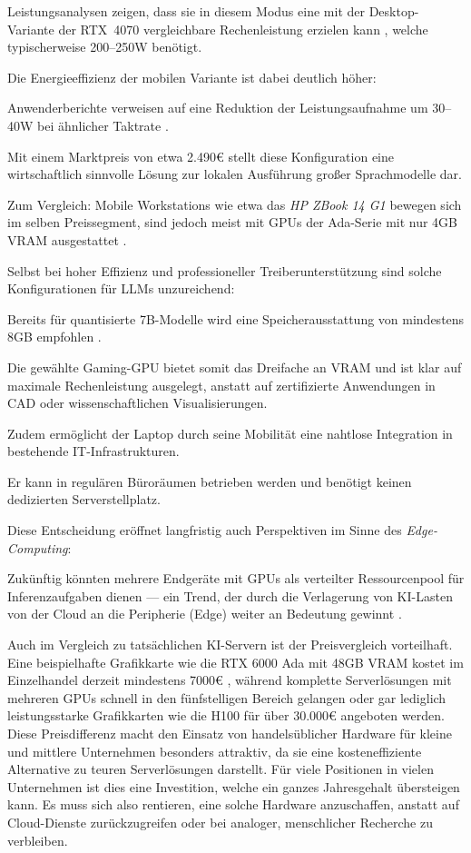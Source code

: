 Leistungsanalysen zeigen, dass sie in diesem Modus eine mit der Desktop-Variante der RTX~4070 vergleichbare Rechenleistung erzielen kann \cite{reddit_rtx_comparison}, welche typischerweise 200–250W benötigt.

Die Energieeffizienz der mobilen Variante ist dabei deutlich höher:

Anwenderberichte verweisen auf eine Reduktion der Leistungsaufnahme um 30–40W bei ähnlicher Taktrate \cite{reddit_rtx_comparison}.

Mit einem Marktpreis von etwa 2.490€ stellt diese Konfiguration eine wirtschaftlich sinnvolle Lösung zur lokalen Ausführung großer Sprachmodelle dar.

Zum Vergleich: Mobile Workstations wie etwa das \textit{HP ZBook 14 G1} bewegen sich im selben Preissegment, sind jedoch meist mit GPUs der Ada-Serie mit nur 4GB VRAM ausgestattet \cite{zbook_review,zbook_specs}.

Selbst bei hoher Effizienz und professioneller Treiberunterstützung sind solche Konfigurationen für LLMs unzureichend:

Bereits für quantisierte 7B-Modelle wird eine Speicherausstattung von mindestens 8GB empfohlen \cite{bacloud_gpu_guide,gpt4all_models}.

Die gewählte Gaming-GPU bietet somit das Dreifache an VRAM und ist klar auf maximale Rechenleistung ausgelegt, anstatt auf zertifizierte Anwendungen in CAD oder wissenschaftlichen Visualisierungen.

Zudem ermöglicht der Laptop durch seine Mobilität eine nahtlose Integration in bestehende IT-Infrastrukturen.

Er kann in regulären Büroräumen betrieben werden und benötigt keinen dedizierten Serverstellplatz.

Diese Entscheidung eröffnet langfristig auch Perspektiven im Sinne des \textit{Edge-Computing}:

Zukünftig könnten mehrere Endgeräte mit GPUs als verteilter Ressourcenpool für Inferenzaufgaben dienen — ein Trend, der durch die Verlagerung von KI-Lasten von der Cloud an die Peripherie (Edge) weiter an Bedeutung gewinnt \cite{edge_medium,datacenter_llm}.

\par

Auch im Vergleich zu tatsächlichen KI-Servern ist der Preisvergleich vorteilhaft.
Eine beispielhafte Grafikkarte wie die RTX 6000 Ada mit 48GB VRAM kostet im Einzelhandel derzeit mindestens 7000€ \cite{rtx6000_price}, während komplette Serverlösungen mit mehreren GPUs schnell in den fünfstelligen Bereich gelangen oder gar lediglich leistungsstarke Grafikkarten wie die H100 für über 30.000€ angeboten werden.
Diese Preisdifferenz macht den Einsatz von handelsüblicher Hardware für kleine und mittlere Unternehmen besonders attraktiv, da sie eine kosteneffiziente Alternative zu teuren Serverlösungen darstellt.
Für viele Positionen in vielen Unternehmen ist dies eine Investition, welche ein ganzes Jahresgehalt übersteigen kann.
Es muss sich also rentieren, eine solche Hardware anzuschaffen, anstatt auf Cloud-Dienste zurückzugreifen oder bei analoger, menschlicher Recherche zu verbleiben.

